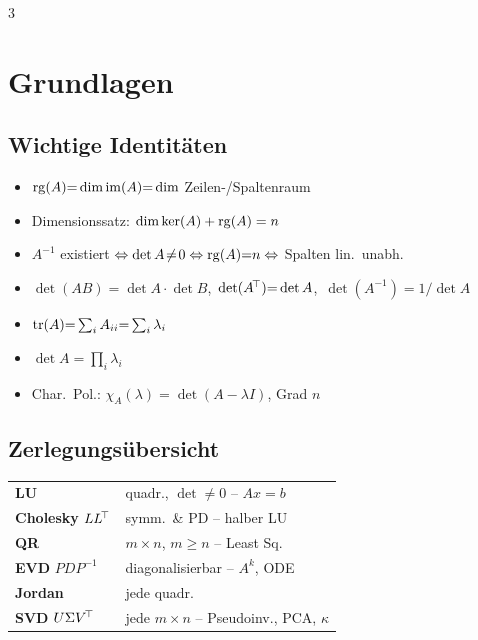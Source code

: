 \documentclass[8pt,a4paper]{extarticle}
\begin{document}

\begin{multicols*}{3}

\section{Grundlagen}
\subsection{Wichtige Identit\"aten}
\begin{itemize}
\item $\operatorname{rg}(A){=}\dim\operatorname{im}(A){=}\dim$ Zeilen-/Spaltenraum
\item Dimensionssatz: $\dim\ker(A)+\operatorname{rg}(A)=n$
\item $A^{-1}$ existiert $\Leftrightarrow \det A\!\ne\!0\Leftrightarrow \operatorname{rg}(A){=}n\Leftrightarrow$ Spalten lin.\ unabh.
\item $\det(AB){=}\det A\cdot\det B$,\ $\det(A^{\!\top}){=}\det A$,\ $\det(A^{-1}){=}1/\det A$
\item $\operatorname{tr}(A){=}\sum_i A_{ii}{=}\sum_i \lambda_i$
\item $\det A=\prod_i\lambda_i$
\item Char.\ Pol.: $\chi_A(\lambda){=}\det(A-\lambda I)$, Grad $n$
\end{itemize}

\subsection{Zerlegungs\"ubersicht}
\begin{tabularx}{\linewidth}{@{}l@{\ }X@{}}
\textbf{LU} & quadr., $\det\!\ne\!0$ -- $Ax{=}b$ \\
\textbf{Cholesky} $LL^{\!\top}$ & symm.\ \& PD -- halber LU \\
\textbf{QR} & $m\!\times\!n$, $m\!\ge\!n$ -- Least Sq.\ \\
\textbf{EVD} $PDP^{-1}$ & diagonalisierbar -- $A^k$, ODE \\
\textbf{Jordan} & jede quadr. \\
\textbf{SVD} $U\Sigma V^{\!\top}$ & jede $m\!\times\!n$ -- Pseudoinv., PCA, $\kappa$ \\
\end{tabularx}


\end{multicols*}
\end{document}
